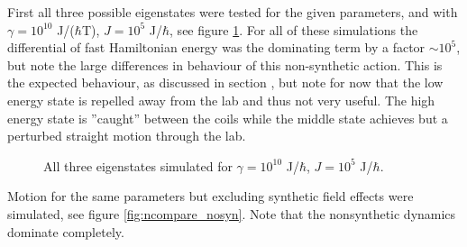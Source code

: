 \documentclass[main.tex]{subfiles}
\begin{document}
First all three possible eigenstates were tested for the given parameters, and with
\(\gamma = 10^{10}\) J/(\(\hbar{}\)T), \(J = 10^5\) J/\(\hbar{}\), see figure
\ref{fig:ncompare}. For all of these simulations the differential of fast Hamiltonian
energy was the dominating term by a factor \(\sim 10^{5}\), but note the large differences
in behaviour of this non-synthetic action. This is the expected behaviour, as discussed in
section %
, but note for now that the low energy state is repelled away from the lab and thus not
very useful. The high energy state is ''caught'' between the coils while the middle state
achieves but a perturbed straight motion through the lab.
\begin{figure}[h]
    \centering
    \qquad
    \qquad
    \caption{\centering All three eigenstates simulated for \(\gamma = 10^{10}\) J/\(\hbar{}\), \(J = 10^5\)
    J/\(\hbar{}\).}%
    \label{fig:ncompare}
\end{figure}
Motion for the same parameters but excluding synthetic field effects were simulated, see
figure \ref{fig:ncompare_nosyn}. Note that the nonsynthetic dynamics dominate completely.
\end{document}
